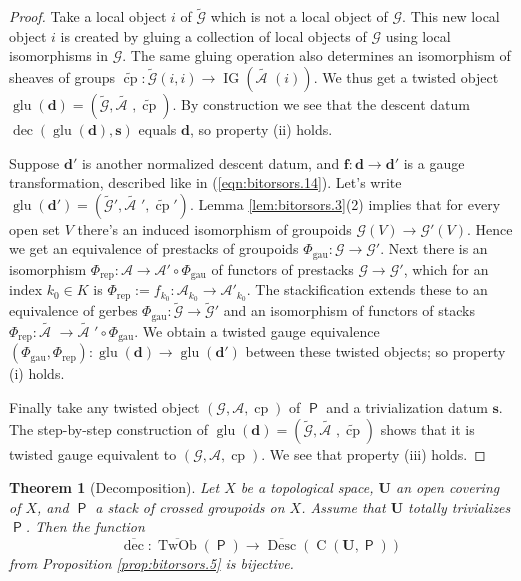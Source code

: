 \documentclass[a4paper, 10pt]{amsart}
\newtheorem{thm}[equation]{Theorem}
\theoremstyle{definition}
\numberwithin{equation}{section}
\newcommand{\opn}{\operatorname}
\newcommand{\cat}[1]{\operatorname{\mathsf{#1}}}
\newcommand{\ol}{\overline}
\newcommand{\mcal}[1]{\mathcal{#1}}
\newcommand{\mrm}[1]{\mathrm{#1}}
\newcommand{\tup}[1]{\textup{#1}}
\newcommand{\bsym}[1]{\boldsymbol{#1}}
\newcommand{\til}[1]{\tilde{#1}}
\newcommand{\gerbe}[1]{\bsym{\mcal{#1}}}
\newcommand{\twocat}[1]{\operatorname{\bsym{\cat{#1}}}}
\begin{document}
\begin{proof}
Take a local object $i$ of $\til{\gerbe{G}}$ which is not a local object of 
$\gerbe{G}$. This new local object $i$ is created by gluing a collection of
local objects of $\gerbe{G}$ using local isomorphisms in $\gerbe{G}$. 
The same gluing operation also 
determines an isomorphism of sheaves of groups 
$\til{\opn{cp}} : \til{\gerbe{G}}(i, i) \to 
\opn{IG}( \til{\gerbe{A}\, \, } \!  (i))$. 
We thus get a twisted object
$\opn{glu}(\bsym{d}) = 
(\til{\gerbe{G}}, \til{\gerbe{A}\, \, } \! ,  \til{\opn{cp}})$.
By construction we see that the descent datum
$\opn{dec}(\opn{glu}(\bsym{d}), \bsym{s})$ equals $\bsym{d}$, so property (ii)
holds.

Suppose $\bsym{d}'$ is another normalized descent datum, and 
$\bsym{f} : \bsym{d} \to \bsym{d}'$ is a gauge transformation, described like
in (\ref{eqn:bitorsors.14}). Let's write 
$\opn{glu}(\bsym{d}') = (\til{\gerbe{G}}', {\til{\gerbe{A}\, \, } \! }', 
\til{\opn{cp}}')$.
Lemma \ref{lem:bitorsors.3}(2) implies that for every open set $V$ there's an
induced isomorphism of group\-oids 
$\gerbe{G}(V) \to \gerbe{G}'(V)$. Hence we get an equivalence of prestacks of
groupoids 
$\Phi_{\mrm{gau}} : \gerbe{G} \to \gerbe{G}'$.
Next there is an isomorphism 
$\Phi_{\mrm{rep}} : \gerbe{A} \to \gerbe{A}' \circ \Phi_{\mrm{gau}}$
of functors of prestacks $\gerbe{G} \to \gerbe{G}'$, which for an index
$k_0 \in K$ is
$\Phi_{\mrm{rep}} := f_{k_0} : \mcal{A}_{k_0} \to \mcal{A}'_{k_0}$. 
The stackification extends these to an equivalence of gerbes  
$\Phi_{\mrm{gau}} : \til{\gerbe{G}} \to \til{\gerbe{G}}'$
and an isomorphism of functors of stacks
$\Phi_{\mrm{rep}} : \til{\gerbe{A}\, \, } \! \! \to 
{\til{\gerbe{A}\, \, } \! \! }' \circ \Phi_{\mrm{gau}}$.
We obtain a twisted gauge equivalence 
$(\Phi_{\mrm{gau}}, \Phi_{\mrm{rep}}) : \opn{glu}(\bsym{d}) \to
\opn{glu}(\bsym{d}')$
between these twisted objects; so property (i) holds.
 
Finally take any twisted object $(\gerbe{G}, \gerbe{A}, \opn{cp})$ of 
$\twocat{P}$ and a trivialization datum $\bsym{s}$.
The step-by-step construction of 
$\opn{glu}(\bsym{d}) = 
(\til{\gerbe{G}}, \til{\gerbe{A}\, \, } \! , \til{\opn{cp}})$
shows that it is twisted gauge equivalent to  
$(\gerbe{G}, \gerbe{A}, \opn{cp})$. We see that property (iii) holds.
\end{proof}

\begin{thm}[Decomposition] \label{thm:glu.1}
Let $X$ be a topological space, $\bsym{U}$ an open covering of $X$,
and $\twocat{P}$ a stack of crossed groupoids on $X$. 
Assume that $\bsym{U}$ totally trivializes $\twocat{P}$. Then the
function 
\[ \ol{\opn{dec}} :  \ol{\opn{TwOb}}(\twocat{P}) \to 
\ol{\opn{Desc}}(\opn{C}(\bsym{U}, \twocat{P}))  \]
from Proposition \tup{\ref{prop:bitorsors.5}} is bijective.
\end{thm}
\end{document}
